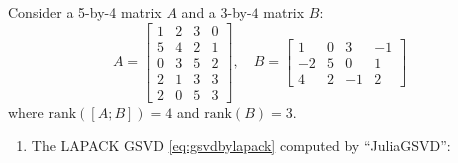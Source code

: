 \newpage
\begin{example} \label{eg:case1a} 
{\rm 
Consider a 5-by-4 matrix $A$ and a $3$-by-$4$ matrix $B$:
    \begin{equation*}
        A = \begin{bmatrix} 
            1 & 2 & 3 & 0\\
            5 & 4 & 2 & 1\\
            0 & 3 & 5 & 2\\
            2 & 1 & 3 & 3\\
            2 & 0 & 5 & 3
        \end{bmatrix}, \quad
        B = \begin{bmatrix}
            1 & 0 & 3 & -1 \\
            -2 & 5 & 0 & 1 \\
            4 & 2 & -1 & 2
        \end{bmatrix}
    \end{equation*}
where $\mbox{rank}([A; B]) = 4$ and $\mbox{rank}(B) = 3$.

\begin{enumerate}[(1).]
\item The LAPACK GSVD \eqref{eq:gsvdbylapack} computed by ``JuliaGSVD'': 
            

\end{enumerate}}
\end{example}
